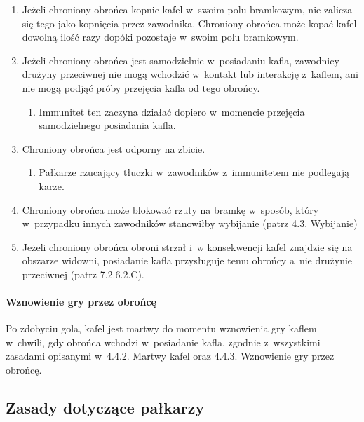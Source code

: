 \documentclass[12pt]{article}
\begin{document}
\begin{enumerate}
	\item
	      Jeżeli chroniony obrońca kopnie kafel w~swoim polu bramkowym, nie
	      zalicza się tego jako kopnięcia przez zawodnika. Chroniony obrońca
	      może kopać kafel dowolną ilość razy dopóki pozostaje w~swoim polu
	      bramkowym.
	\item
	      Jeżeli chroniony obrońca jest samodzielnie w~posiadaniu kafla,
	      zawodnicy drużyny przeciwnej nie mogą wchodzić w~kontakt lub
	      interakcję z~kaflem, ani nie mogą podjąć próby przejęcia kafla od tego
	      obrońcy.

	      \begin{enumerate}
		      \item
		            Immunitet ten zaczyna działać dopiero w~momencie przejęcia
		            samodzielnego posiadania kafla.
	      \end{enumerate}
	\item
	      Chroniony obrońca jest odporny na zbicie.

	      \begin{enumerate}
		      \item
		            Pałkarze rzucający tłuczki w~zawodników z~immunitetem nie podlegają
		            karze.
	      \end{enumerate}
	\item
	      Chroniony obrońca może blokować rzuty na bramkę w~sposób, który w~przypadku innych zawodników stanowiłby wybijanie (patrz 4.3.
	      Wybijanie)
	\item
	      Jeżeli chroniony obrońca obroni strzał i~w konsekwencji kafel znajdzie
	      się na obszarze widowni, posiadanie kafla przysługuje temu obrońcy a~nie drużynie przeciwnej (patrz 7.2.6.2.C).
\end{enumerate}

\paragraph{Wznowienie gry przez obrońcę}
Po zdobyciu gola, kafel
jest martwy do momentu wznowienia gry kaflem w~chwili, gdy obrońca
wchodzi w~posiadanie kafla, zgodnie z~wszystkimi zasadami opisanymi w~4.4.2. Martwy kafel oraz 4.4.3. Wznowienie gry przez obrońcę.

\subsection{Zasady dotyczące pałkarzy}
\end{document}
